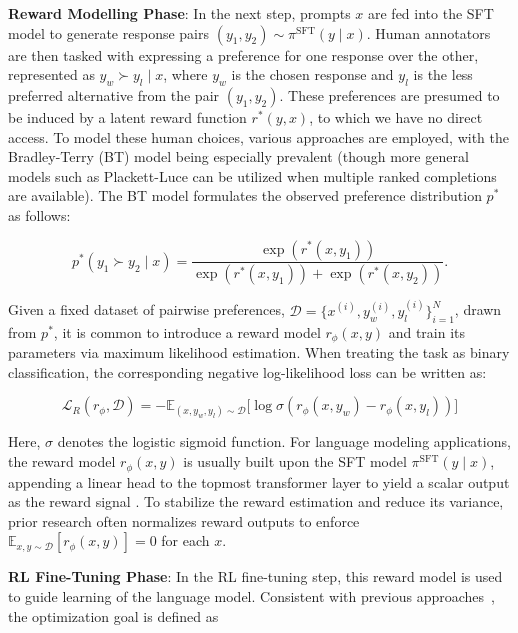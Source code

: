 \textbf{Reward Modelling Phase}: In the next step, prompts $x$ are fed into the SFT model to generate response pairs $(y_1, y_2)\sim \pi^\text{SFT}(y \mid x)$. Human annotators are then tasked with expressing a preference for one response over the other, represented as $y_w\succ y_l \mid x$, where $y_w$ is the chosen response and $y_l$ is the less preferred alternative from the pair $(y_1, y_2)$. These preferences are presumed to be induced by a latent reward function $r^*(y, x)$, to which we have no direct access. To model these human choices, various approaches are employed, with the Bradley-Terry (BT) model \cite{bradley1952rankanalysis} being especially prevalent (though more general models such as Plackett-Luce \citep{plackett1975analysis, luce2012individual} can be utilized when multiple ranked completions are available). The BT model formulates the observed preference distribution $p^*$ as follows:

\begin{equation}\label{eq:bradley-terry}
    p^*(y_1\succ y_2 \mid x)=\frac{\exp\left(r^*(x, y_1)\right)}{\exp\left(r^*(x, y_1)\right) + \exp\left(r^*(x, y_2)\right)}.
\end{equation}

Given a fixed dataset of pairwise preferences, $\mathcal{D}=\bigl\{x^{(i)}, y_w^{(i)}, y_l^{(i)}\bigr\}_{i=1}^N$, drawn from $p^*$, it is common to introduce a reward model $r_{\phi}(x, y)$ and train its parameters via maximum likelihood estimation. When treating the task as binary classification, the corresponding negative log-likelihood loss can be written as:

\begin{equation}\label{eq:reward_model}
    \mathcal{L}_R(r_{\phi}, \mathcal{D}) = -\mathbb{E}_{(x, y_w, y_l)\sim \mathcal{D}}\bigl[\log \sigma(r_{\phi}(x, y_w)- r_{\phi}(x, y_l))\bigr]
\end{equation}

Here, $\sigma$ denotes the logistic sigmoid function. For language modeling applications, the reward model $r_{\phi}(x, y)$ is usually built upon the SFT model $\pi^\text{SFT}(y \mid x)$, appending a linear head to the topmost transformer layer to yield a scalar output as the reward signal \cite{ziegler2020finetuning}. To stabilize the reward estimation and reduce its variance, prior research often normalizes reward outputs to enforce $\mathbb{E}_{x,y\sim \mathcal{D}}\left[r_\phi(x, y)\right] = 0$ for each $x$.

\textbf{RL Fine-Tuning Phase}: In the RL fine-tuning step, this reward model is used to guide learning of the language model. Consistent with previous approaches~\citep{jaques2017sequence, jaques2020human}, the optimization goal is defined as

